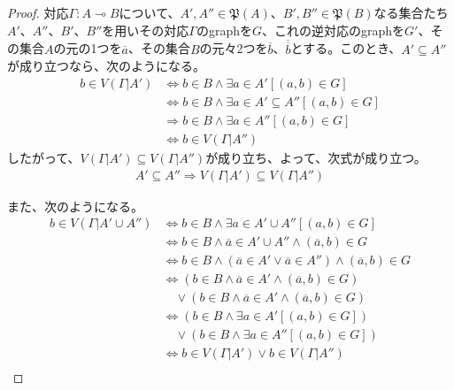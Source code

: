 \documentclass[a4paper]{jsarticle}
\begin{document}
\begin{proof}
対応$\varGamma:A \multimap B$について、$A',A''\in \mathfrak{P}(A)$、$B',B''\in \mathfrak{P}(B)$なる集合たち$A'$、$A''$、$B'$、$B''$を用いその対応$\varGamma$のgraphを$G$、これの逆対応のgraphを$G'$、その集合$A$の元の1つを$\overline{a}$、その集合$B$の元々2つを$\overline{b}$、$\overline{\overline{b}}$とする。このとき、$A' \subseteq A''$が成り立つなら、次のようになる。
\begin{align*}
b \in V\left( \varGamma|A' \right) &\Leftrightarrow b \in B \land \exists a \in A'\left[ (a,b) \in G \right]\\
&\Leftrightarrow b \in B \land \exists a \in A' \subseteq A''\left[ (a,b) \in G \right]\\
&\Rightarrow b \in B \land \exists a \in A''\left[ (a,b) \in G \right] \\
&\Leftrightarrow b \in V\left( \varGamma|A'' \right)
\end{align*}
したがって、$V\left( \varGamma|A' \right) \subseteq V\left( \varGamma|A'' \right)$が成り立ち、よって、次式が成り立つ。
\begin{align*}
A' \subseteq A'' \Rightarrow V\left( \varGamma|A' \right) \subseteq V\left( \varGamma|A'' \right)
\end{align*}\par
また、次のようになる。
\begin{align*}
b \in V\left( \varGamma|A' \cup A'' \right) &\Leftrightarrow b \in B \land \exists a \in A' \cup A''\left[ (a,b) \in G \right]\\
&\Leftrightarrow b \in B \land \overline{a} \in A' \cup A'' \land \left( \overline{a},b \right) \in G\\
&\Leftrightarrow b \in B \land \left( \overline{a} \in A' \vee \overline{a} \in A'' \right) \land \left( \overline{a},b \right) \in G\\
&\Leftrightarrow \left( b \in B \land \overline{a} \in A' \land \left( \overline{a},b \right) \in G \right) \\
&\quad \vee \left( b \in B \land \overline{a} \in A' \land \left( \overline{a},b \right) \in G \right)\\
&\Leftrightarrow \left( b \in B \land \exists a \in A'\left[ (a,b) \in G \right] \right) \\ 
&\quad \vee \left( b \in B \land \exists a \in A''\left[ (a,b) \in G \right] \right)\\
&\Leftrightarrow b \in V\left( \varGamma|A' \right) \vee b \in V\left( \varGamma|A'' \right) \\

\end{align*}
\end{proof}
\end{document}
